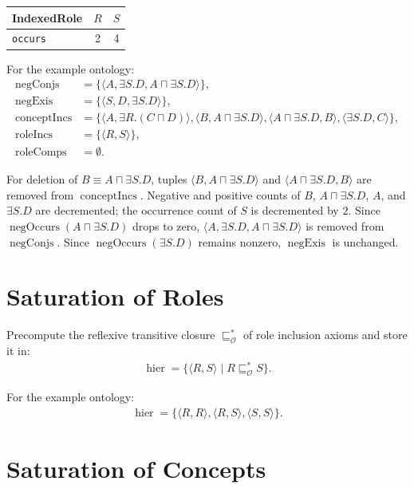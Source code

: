 \documentclass[11pt]{article}
\newcommand{\Ont}{\mathcal O}
\newcommand{\sub}{\sqsubseteq}
\newcommand{\equivc}{\equiv}
\newcommand{\occursNeg}{\operatorname{negOccurs}}
\newcommand{\hier}{\operatorname{hier}}
\newcommand{\negConjs}{\operatorname{negConjs}}
\newcommand{\negExis}{\operatorname{negExis}}
\newcommand{\conceptIncs}{\operatorname{conceptIncs}}
\newcommand{\roleIncs}{\operatorname{roleIncs}}
\newcommand{\roleComps}{\operatorname{roleComps}}
\begin{document}
\begin{center}
\begin{tabular}{lcc}
\toprule
\textbf{IndexedRole} & $R$ & $S$ \\
\midrule
\texttt{occurs} & 2 & 4 \\
\bottomrule
\end{tabular}
\end{center}

For the example ontology:
\begin{align*}
\negConjs &= \{\langle A,\exists S.D,A\sqcap \exists S.D\rangle\},\\
\negExis &= \{\langle S,D,\exists S.D\rangle\},\\
\conceptIncs &= \{\langle A,\exists R.(C\sqcap D)\rangle,
\langle B,A\sqcap \exists S.D\rangle,
\langle A\sqcap \exists S.D,B\rangle,
\langle \exists S.D,C\rangle\},\\
\roleIncs &= \{\langle R,S\rangle\},\\
\roleComps &= \emptyset.
\end{align*}

For deletion of $B \equivc A \sqcap \exists S.D$, tuples $\langle B,A\sqcap\exists S.D\rangle$ and $\langle A\sqcap\exists S.D,B\rangle$ are removed from $\conceptIncs$. Negative and positive counts of $B$, $A\sqcap\exists S.D$, $A$, and $\exists S.D$ are decremented; the occurrence count of $S$ is decremented by $2$. Since $\occursNeg(A\sqcap\exists S.D)$ drops to zero, $\langle A,\exists S.D,A\sqcap\exists S.D\rangle$ is removed from $\negConjs$. Since $\occursNeg(\exists S.D)$ remains nonzero, $\negExis$ is unchanged.

\section{Saturation of Roles}

Precompute the reflexive transitive closure $\sub^{*}_{\Ont}$ of role inclusion axioms and store it in:
\begin{align*}
\hier = \{\langle R,S\rangle \mid R \sub^{*}_{\Ont} S\}.
\end{align*}

For the example ontology:
\begin{align*}
\hier = \{\langle R,R\rangle,\langle R,S\rangle,\langle S,S\rangle\}.
\end{align*}

\section{Saturation of Concepts}
\end{document}
